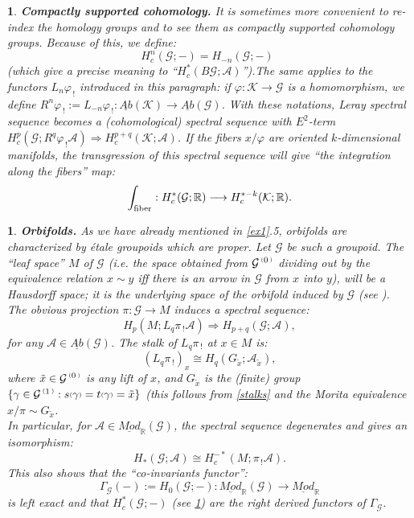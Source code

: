 \documentclass[a4paper]{article}
\newtheorem{num}[st]{}
\newcommand{\f}{\ensuremath{\varphi}}
\newcommand{\rmap}{\longrightarrow}
\newcommand{\Ka}{\ensuremath{\mathcal{K}}}
\newcommand{\G}{\ensuremath{\mathcal{G}}}
\newcommand{\A}{\ensuremath{\mathcal{A}}}
\newcommand{\abG}{\ensuremath{\underline{Ab}(\G)}}
\newcommand{\abK}{\ensuremath{\underline{Ab}(\Ka)}}
\newcommand{\ps}{{\raise 1pt\hbox{\tiny (}}}
\newcommand{\pd}{{\raise 1pt\hbox{\tiny )}}}
\newcommand{\nG}[1]{\ensuremath{\G^{\,\ps #1\,\pd}}}
\begin{document}
\begin{num}
\label{comcoh}
\emph{
{\bf Compactly supported cohomology.} It is sometimes more convenient to re-index the homology groups and to see them as compactly supported cohomology groups. Because of this, we define:
\[ H_c^{n}(\G; - ) = H_{-n}(\G; - )\ \ \]
(which give a precise meaning to ``$H_c^{*}(B\G; \A)$'').The same applies to the functors $L_n\f_{\, !}$ introduced in this paragraph: if $\f: \Ka \rmap \G$ is a homomorphism, we define $R^n\f_{\, !}:= L_{-n}\f_{\, !}: \abK \rmap \abG$. With these notations, Leray spectral sequence becomes a (cohomological) spectral sequence with $E^2$-term $H_c^p(\G; R^{q}\f_{\, !}\A) \Longrightarrow H_c^{p+ q}(\Ka; \A)$. If the fibers $x/\f$ are oriented $k$-dimensional manifolds, the transgression of this spectral sequence will give ``the integration along the fibers'' map:
\[   \int_{\rm fiber} : H_c^*(\G; \mathbb{R}) \rmap H_c^{*- k}(\Ka; \mathbb{R}) .\]
}
\end{num}







\begin{num}
\emph{
\label{orbif}
{\bf Orbifolds.} As we have already mentioned in \ref{ex1}.5, orbifolds are characterized by \'etale groupoids which are proper. Let $\G$ be such a groupoid. The ``leaf space'' $M$ of $\G$ (i.e. the space obtained from $\nG{0}$ dividing out by the equivalence relation $x \sim y$ iff there is an arrow in $\G$ from $x$ into $y$), will be a Hausdorff space; it is the underlying space of the orbifold induced by $\G$ (see \cite{MP}). The obvious projection $\pi :\G\rmap M$ induces a spectral sequence:
\[ H_p(M; L_q\pi_{\, !}\A) \Longrightarrow H_{p+ q}(\G;\A), \]
for any $\A\in \abG$. The stalk of $L_q\pi_{\, !}$ at $x\in M$ is:
\[ (L_q\pi_{\, !})_{x} \cong H_q(G_{\tilde{x}}; \A_{\tilde{x}}),\]
where $\tilde{x}\in\nG{0}$ is any lift of $x$, and $G_{\tilde{x}}$ is the (finite) group $\{ \gamma\in\nG{1}: s\ps\gamma\pd = t\ps\gamma\pd =\tilde{x}\}$ (this follows from \ref{stalks} and the Morita equivalence $x/\pi \sim G_{\tilde{x}}$.\\
\hspace*{.3in} In particular, for $\A\in \underline{Mod}_{\mathbb{R}}(\G)$, the spectral sequence degenerates and gives an isomorphism:
\begin{equation}
\label{s1}
H_{*}(\G; \A) \cong H_c^{-*}(M; \pi_{\, !}\A) .
\end{equation}
\hspace*{.3in} This also shows that the ``co-invariants functor'':
\[ \Gamma_{\G}( -):= H_0(\G; -) : \underline{Mod}_{\mathbb{R}}(\G) \rmap \underline{Mod}_{\mathbb{R}} \]
is left exact and that $H_c^*(\G; -)$ (see \ref{comcoh}) are the right derived functors of $\Gamma_{\G}$.
}
\end{num}
\end{document}
